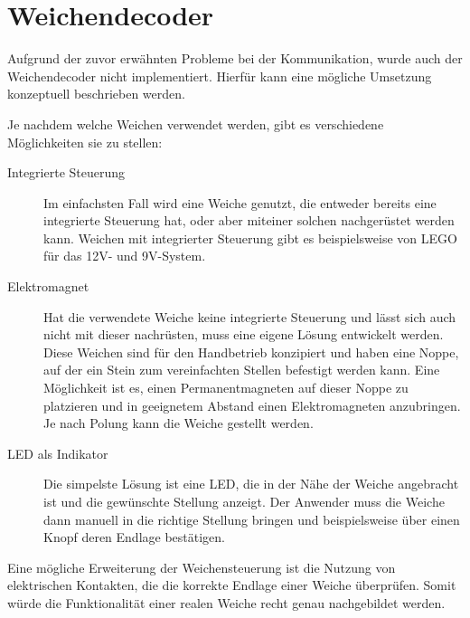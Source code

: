 \section{Weichendecoder}\label{text:Entwicklung-des-Stellwerks:Weichendecoder}

Aufgrund der zuvor erwähnten Probleme bei der Kommunikation, wurde auch der Weichendecoder nicht implementiert. Hierfür kann eine mögliche Umsetzung konzeptuell beschrieben werden.

Je nachdem welche Weichen verwendet werden, gibt es verschiedene Möglichkeiten sie zu stellen:

\begin{description}
    \item[Integrierte Steuerung] Im einfachsten Fall wird eine Weiche genutzt, die entweder bereits eine integrierte Steuerung hat, oder aber miteiner solchen nachgerüstet werden kann. Weichen mit integrierter Steuerung gibt es beispielsweise von LEGO\textsuperscript{\tiny{\textregistered}} für das 12V- und 9V-System.
    \item[Elektromagnet] Hat die verwendete Weiche keine integrierte Steuerung und lässt sich auch nicht mit dieser nachrüsten, muss eine eigene Lösung entwickelt werden. Diese Weichen sind für den Handbetrieb konzipiert und haben eine Noppe, auf der ein Stein zum vereinfachten Stellen befestigt werden kann. Eine Möglichkeit ist es, einen Permanentmagneten auf dieser Noppe zu platzieren und in geeignetem Abstand einen Elektromagneten anzubringen. Je nach Polung kann die Weiche gestellt werden.
    \item[LED als Indikator] Die simpelste Lösung ist eine LED, die in der Nähe der Weiche angebracht ist und die gewünschte Stellung anzeigt. Der Anwender muss die Weiche dann manuell in die richtige Stellung bringen und beispielsweise über einen Knopf deren Endlage bestätigen.
\end{description}

Eine mögliche Erweiterung der Weichensteuerung ist die Nutzung von elektrischen Kontakten, die die korrekte Endlage einer Weiche überprüfen. Somit würde die Funktionalität einer realen Weiche recht genau nachgebildet werden.
